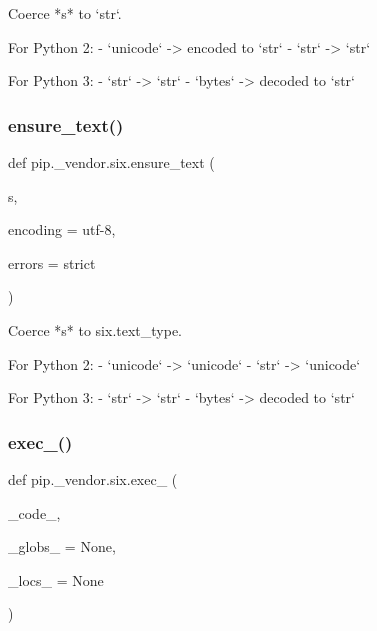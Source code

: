 \begin{DoxyVerb}Coerce *s* to `str`.

For Python 2:
  - `unicode` -> encoded to `str`
  - `str` -> `str`

For Python 3:
  - `str` -> `str`
  - `bytes` -> decoded to `str`
\end{DoxyVerb}
 \mbox{\label{namespacepip_1_1__vendor_1_1six_a876d78ba61942e076dbc2c335c180f1c}} 
\subsubsection{\texorpdfstring{ensure\+\_\+text()}{ensure\_text()}}
{\footnotesize\ttfamily def pip.\+\_\+vendor.\+six.\+ensure\+\_\+text (\begin{DoxyParamCaption}\item[{}]{s,  }\item[{}]{encoding = {\ttfamily \textquotesingle{}utf-\/8\textquotesingle{}},  }\item[{}]{errors = {\ttfamily \textquotesingle{}strict\textquotesingle{}} }\end{DoxyParamCaption})}

\begin{DoxyVerb}Coerce *s* to six.text_type.

For Python 2:
  - `unicode` -> `unicode`
  - `str` -> `unicode`

For Python 3:
  - `str` -> `str`
  - `bytes` -> decoded to `str`
\end{DoxyVerb}
 \mbox{\label{namespacepip_1_1__vendor_1_1six_a8d59a77fbe8c8bcb280d056ccfd07dab}} 
\subsubsection{\texorpdfstring{exec\+\_\+()}{exec\_()}}
{\footnotesize\ttfamily def pip.\+\_\+vendor.\+six.\+exec\+\_\+ (\begin{DoxyParamCaption}\item[{}]{\+\_\+code\+\_\+,  }\item[{}]{\+\_\+globs\+\_\+ = {\ttfamily None},  }\item[{}]{\+\_\+locs\+\_\+ = {\ttfamily None} }\end{DoxyParamCaption})}

